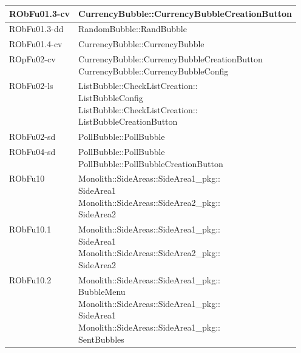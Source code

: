 \begin{center}
\begin{longtable}{|
*{1}{>{\centering\arraybackslash}m{2.5cm}|}
*{1}{>{\centering\arraybackslash}m{7.5cm}|}}
RObFu01.3-cv & \makecell[l]{CurrencyBubble::CurrencyBubbleCreationButton
\\}\\\hline
RObFu01.3-dd & \makecell[l]{RandomBubble::RandBubble
\\}\\\hline
RObFu01.4-cv & \makecell[l]{CurrencyBubble::CurrencyBubble
\\}\\\hline
ROpFu02-cv & \makecell[l]{CurrencyBubble::CurrencyBubbleCreationButton
\\CurrencyBubble::CurrencyBubbleConfig
\\}\\\hline
RObFu02-ls & \makecell[l]{ListBubble::CheckListCreation:: \\ \hfill ListBubbleConfig
\\ListBubble::CheckListCreation:: \\ \hfill ListBubbleCreationButton
\\}\\\hline
RObFu02-sd & \makecell[l]{PollBubble::PollBubble
\\}\\\hline
RObFu04-sd & \makecell[l]{PollBubble::PollBubble
\\PollBubble::PollBubbleCreationButton
\\}\\\hline
RObFu10 & \makecell[l]{Monolith::SideAreas::SideArea1\_pkg:: \\ \hfill SideArea1
\\Monolith::SideAreas::SideArea2\_pkg:: \\ \hfill SideArea2
\\}\\\hline
RObFu10.1 & \makecell[l]{Monolith::SideAreas::SideArea1\_pkg:: \\ \hfill SideArea1
\\Monolith::SideAreas::SideArea2\_pkg:: \\ \hfill SideArea2
\\}\\\hline
RObFu10.2 & \makecell[l]{Monolith::SideAreas::SideArea1\_pkg:: \\ \hfill BubbleMenu
\\Monolith::SideAreas::SideArea1\_pkg:: \\ \hfill SideArea1
\\Monolith::SideAreas::SideArea1\_pkg:: \\ \hfill SentBubbles
\\}\\\hline

\end{longtable}
\end{center}
